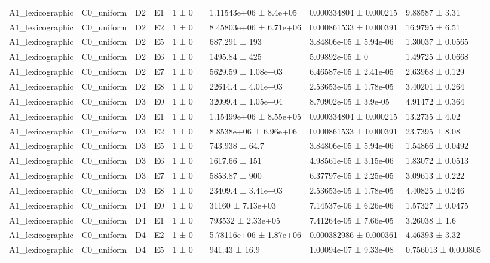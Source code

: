\begin{table}
\begin{tabular}{lllllllll}
A1\_lexicographic & C0\_uniform & D2 & E1 & 1 ± 0 &  & 1.11543e+06 ± 8.4e+05 & 0.000334804 ± 0.000215 & 9.88587 ± 3.31 \\
A1\_lexicographic & C0\_uniform & D2 & E2 & 1 ± 0 &  & 8.45803e+06 ± 6.71e+06 & 0.000861533 ± 0.000391 & 16.9795 ± 6.51 \\
A1\_lexicographic & C0\_uniform & D2 & E5 & 1 ± 0 &  & 687.291 ± 193 & 3.84806e-05 ± 5.94e-06 & 1.30037 ± 0.0565 \\
A1\_lexicographic & C0\_uniform & D2 & E6 & 1 ± 0 &  & 1495.84 ± 425 & 5.09892e-05 ± 0 & 1.49725 ± 0.0668 \\
A1\_lexicographic & C0\_uniform & D2 & E7 & 1 ± 0 &  & 5629.59 ± 1.08e+03 & 6.46587e-05 ± 2.41e-05 & 2.63968 ± 0.129 \\
A1\_lexicographic & C0\_uniform & D2 & E8 & 1 ± 0 &  & 22614.4 ± 4.01e+03 & 2.53653e-05 ± 1.78e-05 & 3.40201 ± 0.264 \\
A1\_lexicographic & C0\_uniform & D3 & E0 & 1 ± 0 &  & 32099.4 ± 1.05e+04 & 8.70902e-05 ± 3.9e-05 & 4.91472 ± 0.364 \\
A1\_lexicographic & C0\_uniform & D3 & E1 & 1 ± 0 &  & 1.15499e+06 ± 8.55e+05 & 0.000334804 ± 0.000215 & 13.2735 ± 4.02 \\
A1\_lexicographic & C0\_uniform & D3 & E2 & 1 ± 0 &  & 8.8538e+06 ± 6.96e+06 & 0.000861533 ± 0.000391 & 23.7395 ± 8.08 \\
A1\_lexicographic & C0\_uniform & D3 & E5 & 1 ± 0 &  & 743.938 ± 64.7 & 3.84806e-05 ± 5.94e-06 & 1.54866 ± 0.0492 \\
A1\_lexicographic & C0\_uniform & D3 & E6 & 1 ± 0 &  & 1617.66 ± 151 & 4.98561e-05 ± 3.15e-06 & 1.83072 ± 0.0513 \\
A1\_lexicographic & C0\_uniform & D3 & E7 & 1 ± 0 &  & 5853.87 ± 900 & 6.37797e-05 ± 2.25e-05 & 3.09613 ± 0.222 \\
A1\_lexicographic & C0\_uniform & D3 & E8 & 1 ± 0 &  & 23409.4 ± 3.41e+03 & 2.53653e-05 ± 1.78e-05 & 4.40825 ± 0.246 \\
A1\_lexicographic & C0\_uniform & D4 & E0 & 1 ± 0 &  & 31160 ± 7.13e+03 & 7.14537e-06 ± 6.26e-06 & 1.57327 ± 0.0475 \\
A1\_lexicographic & C0\_uniform & D4 & E1 & 1 ± 0 &  & 793532 ± 2.33e+05 & 7.41264e-05 ± 7.66e-05 & 3.26038 ± 1.6 \\
A1\_lexicographic & C0\_uniform & D4 & E2 & 1 ± 0 &  & 5.78116e+06 ± 1.87e+06 & 0.000382986 ± 0.000361 & 4.46393 ± 3.32 \\
A1\_lexicographic & C0\_uniform & D4 & E5 & 1 ± 0 &  & 941.43 ± 16.9 & 1.00094e-07 ± 9.33e-08 & 0.756013 ± 0.000805 \\

\end{tabular}
\end{table}
